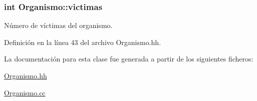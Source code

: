 \subsubsection[{\texorpdfstring{victimas}{victimas}}]{\setlength{\rightskip}{0pt plus 5cm}int Organismo\+::victimas\hspace{0.3cm}{\ttfamily [private]}}\hypertarget{class_organismo_abb3e56487a080df544a6ff96e5e42520}{}\label{class_organismo_abb3e56487a080df544a6ff96e5e42520}


Número de víctimas del organismo. 



Definición en la línea 43 del archivo Organismo.\+hh.



La documentación para esta clase fue generada a partir de los siguientes ficheros\+:\begin{DoxyCompactItemize}
\item 
\hyperlink{_organismo_8hh}{Organismo.\+hh}\item 
\hyperlink{_organismo_8cc}{Organismo.\+cc}\end{DoxyCompactItemize}
